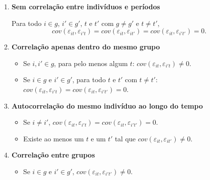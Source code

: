 \documentclass[portugues]{article}
\begin{document}
\begin{enumerate}
    \item \textbf{Sem correlação entre indivíduos e períodos}
    
        Para todo $i \in g$, $i' \in g'$, $t$ e $t'$ com $g\neq g'$ e $t\neq t'$,  
        $$ cov(\varepsilon_{it}, \varepsilon_{i' t})  = cov(\varepsilon_{it}, \varepsilon_{it'}) = cov(\varepsilon_{it}, \varepsilon_{i't'}) = 0.$$
        
    \item \textbf{Correlação apenas dentro do mesmo grupo}

        \begin{itemize}
            \item Se $i, i' \in g$, para pelo menos algum $t$: $cov(\varepsilon_{it}, \varepsilon_{i't}) \neq 0$.
            \item Se $i \in g$ e $i' \in g'$, para todo $t$ e $t'$ com $t \neq t'$: $cov(\varepsilon_{it},\varepsilon_{i't}) = cov(\varepsilon_{it},\varepsilon_{i't'}) = 0$.
        \end{itemize}

    \item \textbf{Autocorrelação do mesmo indivíduo ao longo do tempo}

        \begin{itemize}
            \item Se $i \neq i'$, $cov(\varepsilon_{it},\varepsilon_{i't}) = cov(\varepsilon_{it},\varepsilon_{i't'}) = 0$.
            \item Existe ao menos um $t$ e um $t'$ tal que $cov(\varepsilon_{it}, \varepsilon_{it'}) \neq 0$.
        \end{itemize}

    \item \textbf{Correlação entre grupos}

    \begin{itemize}
        \item Se $i \in g$ e $i' \in g'$, $cov(\varepsilon_{it}, \varepsilon_{i't'}) \neq 0$.
    \end{itemize}
\end{enumerate}



           
\end{document}
